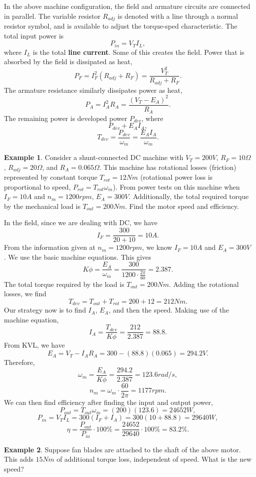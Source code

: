 \documentclass[11pt]{article}
\theoremstyle{plain} %
\theoremstyle{definition}
\theoremstyle{example}
\newtheorem*{example}{Example}
\theoremstyle{remark}
\begin{document}
In the above machine configuration, the field and armature circuits are connected in parallel. The variable resistor $R_{adj}$ is denoted with a line through a normal resistor symbol, and is available to adjust the torque-sped characteristic. The total input power is 
$$P_{in} = V_TI_L,$$
where $I_L$ is the total \textbf{line current}. Some of this creates the field. Power  that is absorbed by the field is dissipated as heat, 
$$P_F = I_F^2(R_{adj} + R_F) = \frac{V_T^2}{R_{adj} + R_F}.$$
The armature resistance similarly dissipates power as heat,
$$P_A = I_A^2R_A = \frac{(V_T-E_A)^2}{R_A}.$$
The remaining power is developed power $P_{dev}$, where
$$P_{dev} + E_AI_A,$$
$$T_{dev} = \frac{P_{dev}}{\omega_m} = \frac{E_AI_A}{\omega_m}.$$
\begin{example}
Consider a shunt-connected DC machine with $V_T=200V$, $R_F = 10\Omega$, $R_{adj} = 20\Omega$, and $R_A = 0.065\Omega$. This machine has rotational losses (friction) represented by constant torque $T_{rot}=12Nm$ (rotational power loss is proportional to speed, $P_{rot} = T_{rot}\omega_m$). From power tests on this machine when $I_F=10A$ and $n_m=1200rpm$, $E_A = 300V$. Additionally, the total required torque by the mechanical load is $T_{out} = 200Nm$. Find the motor speed and efficiency. 
\end{example}
In the field, since we are dealing with DC, we have 
$$I_F= \frac{300}{20+10}  = 10A.$$
From the information given at $n_m=1200rpm$, we know $I_F=10A$ and $E_A = 300V$. We use the basic machine equations. This gives
$$K\phi = \frac{E_A}{\omega_m} = \frac{300}{1200\cdot \frac{2\pi}{60}} = 2.387.$$
The total torque required by the load is $T_{out} = 200Nm$. Adding the rotational losses, we find 
$$T_{dev} = T_{out} + T_{rot} = 200+12 = 212Nm.$$
Our strategy now is to find $I_A$, $E_A$, and then the speed. Making use of the machine equation, 
$$I_A = \frac{T_{dev}}{K\phi} = \frac{212}{2.387}=88.8.$$
From KVL, we have
$$E_A = V_T-I_AR_A = 300-(88.8)(0.065) = 294.2V.$$Therefore, 
$$\omega_m = \frac{E_A}{K\phi} = \frac{294.2}{2.387} = 123.6rad/s,$$
$$n_m = \omega_m\cdot \frac{60}{2\pi} = 1177rpm.$$
We can then find efficiency after finding the input and output power,
$$P_{out} = T_{out}\omega_m = (200)(123.6) = 24652W,$$
$$P_{in} = V_TI_L = 300(I_F+I_A)=300(10+88.8) = 29640W,$$
$$\eta = \frac{P_{out}}{P_{in}} \cdot 100\% = \frac{24652}{29640}\cdot100\% = 83.2\%.$$

\begin{example}
Suppose fan blades are attached to the shaft of the above motor. This adds $15Nm$ of additional torque loss, independent of speed. What is the new speed?
\end{example}
\end{document}
